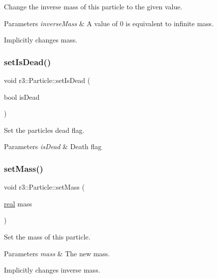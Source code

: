 Change the inverse mass of this particle to the given value. 


\begin{DoxyParams}{Parameters}
{\em inverse\+Mass} & A value of 0 is equivalent to infinite mass.\\
\hline
\end{DoxyParams}
Implicitly changes mass. \mbox{\label{classr3_1_1_particle_a1f0b0ac6f094025e02359026c681350f}} 
\subsubsection{\texorpdfstring{set\+Is\+Dead()}{setIsDead()}}
{\footnotesize\ttfamily void r3\+::\+Particle\+::set\+Is\+Dead (\begin{DoxyParamCaption}\item[{bool}]{is\+Dead }\end{DoxyParamCaption})}



Set the particle\textquotesingle{}s dead flag. 


\begin{DoxyParams}{Parameters}
{\em is\+Dead} & Death flag \\
\hline
\end{DoxyParams}
\mbox{\label{classr3_1_1_particle_a01f396041b3b54d674e227d56d600f6b}} 
\subsubsection{\texorpdfstring{set\+Mass()}{setMass()}}
{\footnotesize\ttfamily void r3\+::\+Particle\+::set\+Mass (\begin{DoxyParamCaption}\item[{\mbox{\hyperlink{namespacer3_ab2016b3e3f743fb735afce242f0dc1eb}{real}}}]{mass }\end{DoxyParamCaption})}



Set the mass of this particle. 


\begin{DoxyParams}{Parameters}
{\em mass} & The new mass.\\
\hline
\end{DoxyParams}
Implicitly changes inverse mass. \mbox{\label{classr3_1_1_particle_a22926644001b62f3e8bf1f9cf02b64e9}} 
